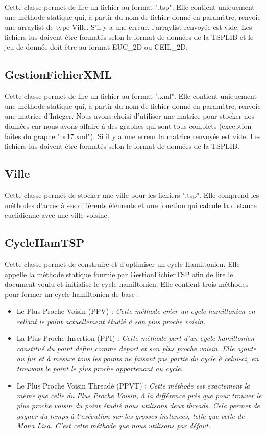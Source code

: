 \documentclass{article}
\begin{document}
Cette classe permet de lire un fichier au format ".tsp".
Elle contient uniquement une méthode statique qui, à partir du nom de fichier donné en paramètre, renvoie une arraylist de type Ville.
S'il y a une erreur, l'arraylist renvoyée est vide.
Les fichiers lus doivent être formatés selon le format de données de la TSPLIB et le jeu de donnée doit être au format EUC\_2D ou CEIL\_2D.

\subsection{GestionFichierXML}

Cette classe permet de lire un fichier au format ".xml".
Elle contient uniquement une méthode statique qui, à partir du nom de fichier donné en paramètre, renvoie une matrice d'Integer.
Nous avons choisi d'utiliser une matrice pour stocker nos données car nous avons affaire à des graphes qui sont tous complets (exception faîtes du graphe "br17.xml").
Si il y a une erreur la matrice renvoyée est vide.
Les fichiers lus doivent être formatés selon le format de données de la TSPLIB.

\subsection{Ville}

Cette classe permet de stocker une ville pour les fichiers ".tsp".
Elle comprend les méthodes d'accès à ses différents éléments et une fonction qui calcule la distance euclidienne avec une ville voisine.

\subsection{CycleHamTSP}

Cette classe permet de construire et d'optimiser un cycle Hamiltonien.
Elle appelle la méthode statique fournie par GestionFichierTSP afin de lire le document voulu et initialise le cycle hamiltonien.
Elle contient trois méthodes pour former un cycle hamiltonien de base :

\begin{itemize}
\item Le Plus Proche Voisin (PPV) : \emph{Cette méthode créer un cycle hamiltonien en reliant le point actuellement étudié à son plus proche voisin.}\smallskip

\item La Plus Proche Insertion (PPI) : \emph{Cette méthode part d'un cycle hamiltonien constitué du point défini comme départ et son plus proche voisin. Elle ajoute au fur et à mesure tous les points ne faisant pas partie du cycle à celui-ci, en trouvant le point le plus proche appartenant au cycle.}\smallskip

\item Le Plus Proche Voisin Threadé (PPVT) : \emph{Cette méthode est exactement la même que celle du Plus Proche Voisin, à la différence près que pour trouver le plus proche voisin du point étudié nous utilisons deux threads. Cela permet de gagner du temps à l'exécution sur les grosses instances, telle que celle de Mona Lisa. C'est cette méthode que nous utilisons par défaut.}
\end{itemize}
\end{document}
